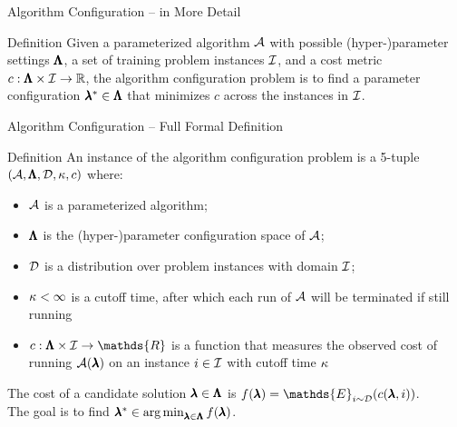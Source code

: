 \begin{frame}[c]{Algorithm Configuration -- in More Detail}

\bigskip

\centering
\scalebox{0.75}{

}

\bigskip

\begin{block}{Definition}
Given a parameterized algorithm $\mathcal{A}$ with possible (hyper-)parameter settings $\pmb{\Lambda}$, \pause 
a set of training problem instances $\mathcal{I}$, \pause 
and a cost metric $c: \pmb{\Lambda} \times \mathcal{I} \rightarrow \mathbb{R}$, \pause 
the algorithm configuration problem is 
to \alert{find a parameter configuration $\pmb{\lambda}^* \in \pmb{\Lambda}$ 
that minimizes $c$ across the instances in $\mathcal{I}$}.
\end{block}

\end{frame}


\begin{frame}[c]{Algorithm Configuration -- Full Formal Definition}

\begin{block}{Definition}
An instance of the algorithm configuration problem
is a 5-tuple $(\mathcal{A}, \pmb{\Lambda}, \mathcal{D}, \kappa, c)$ where:
\begin{itemize}
\item $\mathcal{A}$ is a parameterized algorithm;
\item $\pmb{\Lambda}$ is the (hyper-)parameter configuration space of $\mathcal{A}$;
\item $\mathcal{D}$ is a \alert{distribution over problem instances} with domain $\mathcal{I}$;
\pause
\item $\kappa < \infty$ is a \alert{cutoff time}, after which each run of $\mathcal{A}$ will be terminated if still running
\pause
\item $c: \confs \times \insts \rightarrow \mathds{R}$ is a function that
measures the observed cost of running $\mathcal{A}(\pmb{\lambda})$ on an instance $i \in
\mathcal{I}$ with cutoff time $\kappa$ 
\end{itemize}
\pause
The cost of a candidate solution $\pmb{\lambda}\in\pmb{\Lambda}$ is
\alert{$f(\conf) = \mathds{E}_{\inst \sim \instD} (c(\conf,\inst))$}.\\
The goal is to find \alert{$\pmb{\lambda}^* \in \operatorname*{arg\,min}_{\pmb{\lambda} \in \pmb{\Lambda}} f(\pmb{\lambda})$}.

\end{block}

\end{frame}

